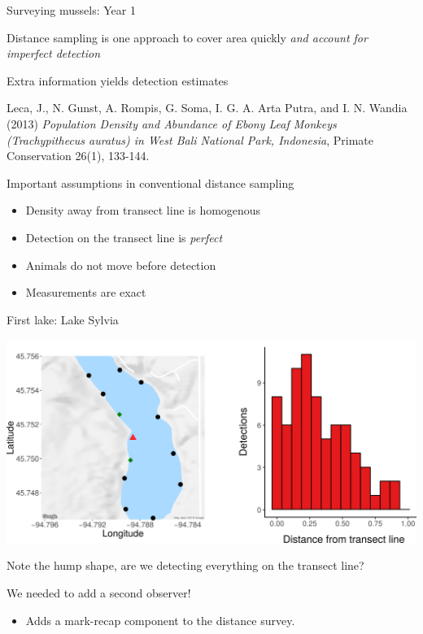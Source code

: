 \documentclass[ignorenonframetext,]{beamer}
\providecommand{\tightlist}{%
  \setlength{\itemsep}{0pt}\setlength{\parskip}{0pt}}
\begin{document}
\begin{frame}{Surveying mussels: Year 1}
\begin{block}{Distance sampling is one approach to cover area quickly
\emph{and account for imperfect detection}}
\end{block}

\begin{block}{Extra information yields detection estimates}

 Leca, J., N. Gunst, A. Rompis, G. Soma, I. G. A. Arta Putra, and I. N.
Wandia (2013) \emph{Population Density and Abundance of Ebony Leaf
Monkeys (Trachypithecus auratus) in West Bali National Park, Indonesia},
Primate Conservation 26(1), 133-144.

\end{block}

\begin{block}{Important assumptions in conventional distance sampling}

\begin{itemize}
\tightlist
\item
  Density away from transect line is homogenous
\item
  Detection on the transect line is \emph{perfect}
\item
  Animals do not move before detection
\item
  Measurements are exact
\end{itemize}

\end{block}

\begin{block}{First lake: Lake Sylvia}

\includegraphics[width=0.9\linewidth]{../Figures/SylviaSummary}

Note the hump shape, are we detecting everything on the transect line?

\end{block}

\begin{block}{We needed to add a second observer!}

\begin{itemize}
\tightlist
\item
  Adds a mark-recap component to the distance survey.


\end{itemize}
\end{block}
\end{frame}
\end{document}
